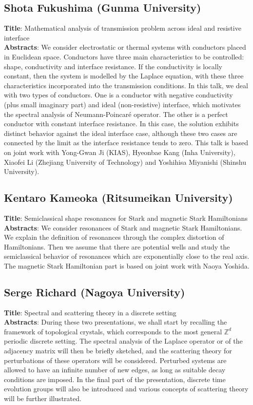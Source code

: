 \documentclass[a4paper,11pt]{article}
\numberwithin{equation}{section}
\begin{document}
\subsection*{\textbf{Shota Fukushima}  (Gunma University)}
\textbf{Title}: Mathematical analysis of transmission problem across ideal and resistive interface\\
\textbf{Abstracts}: We consider electrostatic or thermal systems with conductors placed in Euclidean space. Conductors have three main characteristics to be controlled: shape, conductivity and interface resistance. If the conductivity is locally constant, then the system is modelled by the Laplace equation, with these three characteristics incorporated into the transmission conditions. In this talk, we deal with two types of conductors. One is a conductor with negative conductivity (plus small imaginary part) and ideal (non-resistive) interface, which motivates the spectral analysis of Neumann-Poincaré operator. The other is a perfect conductor with constant interface resistance. In this case, the solution exhibits distinct behavior against the ideal interface case, although these two cases are connected by the limit as the interface resistance tends to zero. This talk is based on joint work with Yong-Gwan Ji (KIAS), Hyeonbae Kang (Inha University), Xiaofei Li (Zhejiang University of Technology) and Yoshihisa Miyanishi (Shinshu University). 

\subsection*{\textbf{Kentaro Kameoka}  (Ritsumeikan University)}
\textbf{Title}: Semiclassical shape resonances for Stark and magnetic Stark Hamiltonians\\
\textbf{Abstracts}: We consider resonances of Stark and magnetic Stark Hamiltonians. We explain the definition of resonances through the complex distortion of  Hamiltonians. Then we assume that there are potential wells and study the semiclassical behavior of resonances which are exponentially close to the real axis. The magnetic Stark Hamiltonian part is based on joint work with Naoya Yoshida.  


\subsection*{\textbf{Serge Richard}  (Nagoya University)}
\textbf{Title}: Spectral and scattering theory in a discrete setting\\
\textbf{Abstracts}: During these two presentations, we shall start by recalling the
framework of topological crystals, which corresponds to the most general
$\mathbb{Z}^d$ periodic discrete setting. The spectral analysis of the Laplace
operator or of the adjacency matrix will then be briefly sketched, and
the scattering theory for perturbations of these operators will be
considered. Perturbed systems are allowed to have an infinite number of
new edges, as long as suitable decay conditions are imposed. In the
final part of the presentation, discrete time evolution groups will also
be introduced and various concepts of scattering theory will be further
illustrated. 
\end{document}
